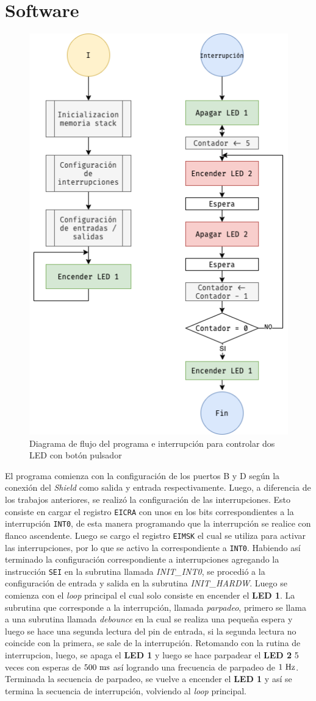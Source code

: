 \section{Software}


\begin{figure}[h]
    \centering
    \includegraphics[width= 6 cm]{imagenes/TP4 Diagrama de flujo.png}
    \caption{Diagrama de flujo del programa e interrupción para controlar dos LED con botón pulsador}
    \label{fig:dflujo}
\end{figure}


El programa comienza con la configuración de los puertos B y D según la conexión del \textit{Shield} como salida y entrada respectivamente.
Luego, a diferencia de los trabajos anteriores, se realizó la configuración de las interrupciones. Esto consiste en cargar el registro \texttt{EICRA} con unos en los bits correspondientes a la interrupción \texttt{INT0}, de esta manera programando que la interrupción se realice con flanco ascendente.
Luego se cargo el registro \texttt{EIMSK} el cual se utiliza para activar las interrupciones, por lo que se activo la correspondiente a \texttt{INT0}. Habiendo así terminado la configuración correspondiente a interrupciones agregando la instrucción \texttt{SEI} en la subrutina llamada \textit{INIT\_INT0}, se procedió a la configuración de entrada y salida en la subrutina \textit{INIT\_HARDW}.
Luego se comienza con el \textit{loop} principal el cual solo consiste en encender el \textbf{LED 1}. 
La subrutina que corresponde a la interrupción, llamada \textit{parpadeo}, primero se llama a una subrutina llamada \textit{debounce} en la cual se realiza una pequeña espera y luego se hace una segunda lectura del pin de entrada, si la segunda lectura no coincide con la primera, se sale de la interrupción. Retomando con la rutina de interrupcion, luego, se apaga el \textbf{LED 1} y luego se hace parpadear el \textbf{LED 2} 5 veces con esperas de $500 \ \si{\milli\second}$ así logrando una frecuencia de parpadeo de $1 \ \si{\hertz}$.
Terminada la secuencia de parpadeo, se vuelve a encender el \textbf{LED 1} y así se termina la secuencia de interrupción, volviendo al \textit{loop} principal.


